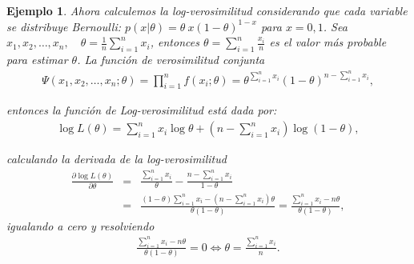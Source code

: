 \documentclass[12pt]{article}
\newtheorem{Ejem}{Ejemplo}%
\begin{document}
\begin{Ejem}
Ahora calculemos la log-verosimilitud considerando que cada variable se distribuye Bernoulli: $p\left(x|\theta\right)=\theta~{x}\left(1-\theta\right)^{1-x}$ para $x=0,1$.
Sea  $x_1, x_2, \dots, x_n, \quad \theta = \frac{1}{n} \sum_{i=1}^{n} x_i$, entonces $\theta=\sum_{i=1}^{n}\frac{x_{i}}{n}$ es el valor m\'as probable para estimar $\theta$. La función de verosimilitud conjunta
\begin{eqnarray}
\Psi(x_1, x_2, \dots, x_n; \theta) = \prod_{i=1}^{n} f(x_i; \theta)= \theta^{\sum_{i=1}^{n} x_i} (1 - \theta)^{n - \sum_{i=1}^{n} x_i},
\end{eqnarray}

entonces la funci\'on de  Log-verosimilitud est\'a dada por:
\begin{eqnarray}
\log L(\theta) = \sum_{i=1}^{n} x_i \log \theta + (n - \sum_{i=1}^{n} x_i) \log (1 - \theta),
\end{eqnarray}

calculando la derivada de la log-verosimilitud
\begin{eqnarray}
\frac{\partial \log L(\theta)}{\partial \theta} &=& \frac{\sum_{i=1}^{n} x_i}{\theta} - \frac{n - \sum_{i=1}^{n}x_i}{1 - \theta}\\
&=& \frac{(1 - \theta) \sum_{i=1}^{n} x_i - (n - \sum_{i=1}^{n} x_i) \theta}{\theta (1 - \theta)} = \frac{\sum_{i=1}^{n} x_i - n \theta}{\theta (1 - \theta)},
\end{eqnarray}
igualando a cero y resolviendo
\begin{eqnarray}
\frac{\sum_{i=1}^{n}x_i - n \theta}{\theta (1 - \theta)}=0\Leftrightarrow \theta =\frac{\sum_{i=1}^{n} x_{i}}{n}.
\end{eqnarray}
\end{Ejem}
\end{document}

